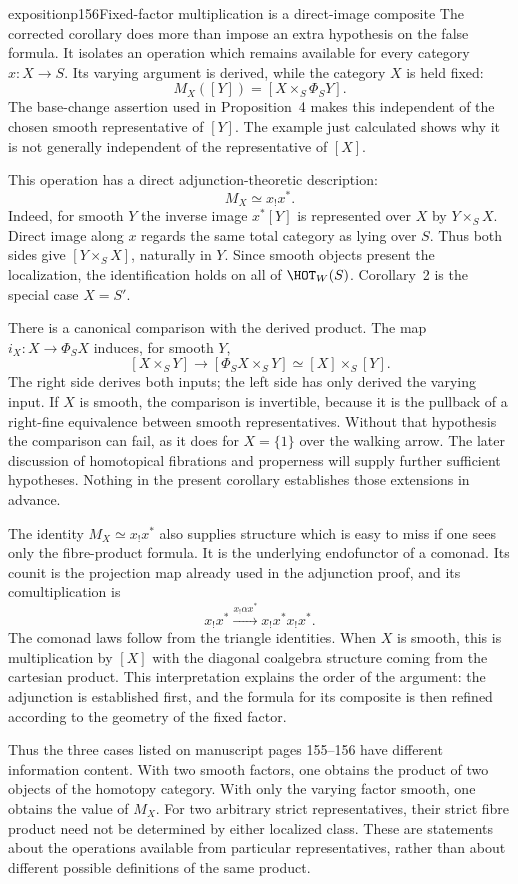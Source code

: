 \begin{dcomment}{exposition}{p156}{Fixed-factor multiplication is a direct-image composite}
The corrected corollary does more than impose an extra hypothesis on the false formula. It isolates an operation which remains available for every category $x:X\longrightarrow S$. Its varying argument is derived, while the category $X$ is held fixed:
\[
 M_X([Y])=[X\times_S\Phi_SY].
\]
The base-change assertion used in Proposition~4 makes this independent of the chosen smooth representative of $[Y]$. The example just calculated shows why it is not generally independent of the representative of $[X]$.

This operation has a direct adjunction-theoretic description:
\[
 M_X\simeq x_!x^*.
\]
Indeed, for smooth $Y$ the inverse image $x^*[Y]$ is represented over $X$ by $Y\times_SX$. Direct image along $x$ regards the same total category as lying over $S$. Thus both sides give $[Y\times_SX]$, naturally in $Y$. Since smooth objects present the localization, the identification holds on all of $\HOT_W(S)$. Corollary~2 is the special case $X=S'$.

There is a canonical comparison with the derived product. The map $i_X:X\longrightarrow\Phi_SX$ induces, for smooth $Y$,
\[
 [X\times_SY]\longrightarrow[\Phi_SX\times_SY]
 \simeq[X]\times_S[Y].
\]
The right side derives both inputs; the left side has only derived the varying input. If $X$ is smooth, the comparison is invertible, because it is the pullback of a right-fine equivalence between smooth representatives. Without that hypothesis the comparison can fail, as it does for $X=\{1\}$ over the walking arrow. The later discussion of homotopical fibrations and properness will supply further sufficient hypotheses. Nothing in the present corollary establishes those extensions in advance.

The identity $M_X\simeq x_!x^*$ also supplies structure which is easy to miss if one sees only the fibre-product formula. It is the underlying endofunctor of a comonad. Its counit is the projection map already used in the adjunction proof, and its comultiplication is
\[
 x_!x^*\xrightarrow{x_!\alpha x^*}x_!x^*x_!x^*.
\]
The comonad laws follow from the triangle identities. When $X$ is smooth, this is multiplication by $[X]$ with the diagonal coalgebra structure coming from the cartesian product. This interpretation explains the order of the argument: the adjunction is established first, and the formula for its composite is then refined according to the geometry of the fixed factor.

Thus the three cases listed on manuscript pages 155--156 have different information content. With two smooth factors, one obtains the product of two objects of the homotopy category. With only the varying factor smooth, one obtains the value of $M_X$. For two arbitrary strict representatives, their strict fibre product need not be determined by either localized class. These are statements about the operations available from particular representatives, rather than about different possible definitions of the same product.
\end{dcomment}

